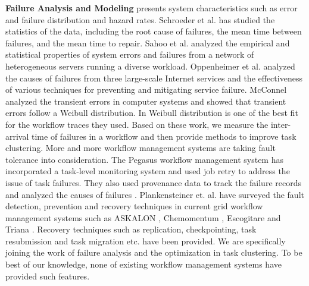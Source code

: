 \textbf{Failure Analysis and Modeling} \cite{Tang1990} presents system characteristics such as error and failure distribution and hazard rates. Schroeder et al. \cite{Schroeder2006} has studied the statistics of the data, including the root cause of failures, the mean time between failures, and the mean time to repair. Sahoo et al. \cite{Sahoo2004} analyzed the empirical and statistical properties of system errors and failures from a network of heterogeneous servers running a diverse workload. Oppenheimer et al. \cite{Oppenheimer2002} analyzed the causes of failures from three large-scale Internet services and the effectiveness of various techniques for preventing and mitigating service failure. McConnel \cite{McConnel1979} analyzed the transient errors in computer systems and showed that transient errors follow a Weibull distribution. In \cite{Sun2003, Iosup2008} Weibull distribution is one of the best fit for the workflow traces they used.  Based on these work, we measure the inter-arrival time of failures in a workflow and then provide methods to improve task clustering.  
More and more workflow management systems are taking fault tolerance into consideration. The Pegasus workflow management system \cite{Deelman2004} has incorporated a task-level monitoring system and used job retry to address the issue of task failures. They also used provenance data to track the failure records and analyzed the causes of failures \cite{Samak2011}. Plankensteiner et. al. \cite{plankensteiner2009fault} have surveyed the fault detection, prevention and recovery techniques in current grid workflow management systems such as ASKALON \cite{fahringer2007askalon}, Chemomentum \cite{schuller2008chemomentum}, Escogitare \cite{laforenza2007biological} and Triana \cite{taylor2007triana}. Recovery techniques such as replication, checkpointing, task resubmission  and task migration etc. have been provided. We are specifically joining the work of failure analysis and the optimization in task clustering. To be best of our knowledge, none of existing workflow management systems have provided such features. 

